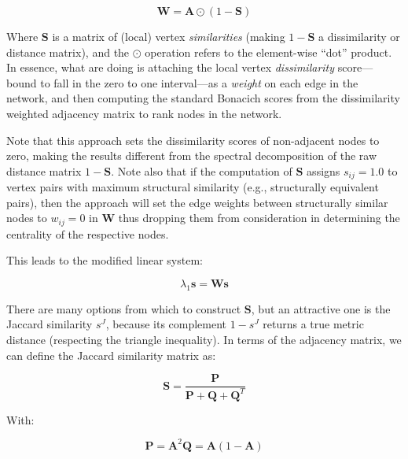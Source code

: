 \documentclass[12pt]{article}
\begin{document}
\begin{equation}
    \mathbf{W} = \mathbf{A} \odot (1 - \mathbf{S})
    \label{eq:ac1}
\end{equation}

Where $\mathbf{S}$ is a matrix of (local) vertex \textit{similarities} (making $1-\mathbf{S}$ a dissimilarity or distance matrix), and the $\odot$ operation refers to the element-wise ``dot'' product. In essence, what \citet{alvarez-socorro2015eigencentrality-66c} are doing is attaching the local vertex \textit{dissimilarity} score---bound to fall in the zero to one interval---as a \textit{weight} on each edge in the network, and then computing the standard Bonacich scores from the dissimilarity weighted adjacency matrix to rank nodes in the network. 

Note that this approach sets the dissimilarity scores of non-adjacent nodes to zero, making the results different from the spectral decomposition of the raw distance matrix $1 - \mathbf{S}$. Note also that if the computation of $\mathbf{S}$ assigns $s_{ij} = 1.0$ to vertex pairs with maximum structural similarity (e.g., structurally equivalent pairs), then the  \citet{alvarez-socorro2015eigencentrality-66c} approach will set the edge weights between structurally similar nodes to $w_{ij} = 0$ in $\mathbf{W}$ thus dropping them from consideration in determining the centrality of the respective nodes. 

This leads to the modified linear system:

\begin{equation}
    \lambda_1\mathbf{s} = \mathbf{W}\mathbf{s}
    \label{eq:ac2}
\end{equation}

There are many options from which to construct $\mathbf{S}$, but an attractive one is the Jaccard similarity $s^J$, because its complement $1-s^J$ returns a true metric distance (respecting the triangle inequality). In terms of the adjacency matrix, we can define the Jaccard similarity matrix as:

\begin{equation}
    \mathbf{S} = \frac{\mathbf{P}}{\mathbf{P}+\mathbf{Q}+\mathbf{Q}^T}
\end{equation}

With:

\begin{subequations}
\begin{equation}
    \mathbf{P} = \mathbf{A}^2
\end{equation}
\begin{equation}
    \mathbf{Q} = \mathbf{A}(1-\mathbf{A})
\end{equation}
\end{subequations}
\end{document}
